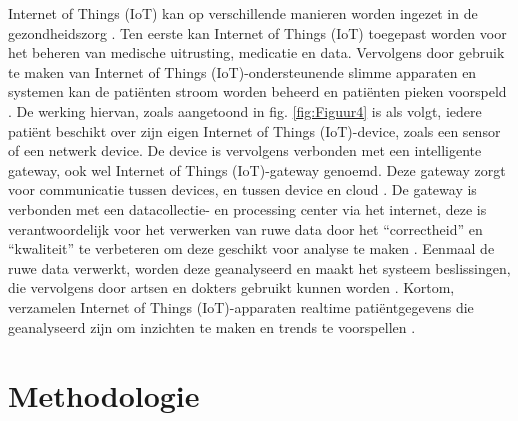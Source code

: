 Internet of Things (IoT) kan op verschillende manieren worden ingezet in de gezondheidszorg \autocite{Huang2021}. Ten eerste kan Internet of Things (IoT) toegepast worden voor het beheren van medische uitrusting, medicatie en data. Vervolgens door gebruik te maken van Internet of Things (IoT)-ondersteunende slimme apparaten en systemen kan de patiënten stroom worden beheerd \autocite{Almotaira2023} en patiënten pieken voorspeld \autocite{King2022}. De werking hiervan, zoals aangetoond in fig. \ref{fig:Figuur4} is als volgt, iedere patiënt beschikt over zijn eigen Internet of Things (IoT)-device, zoals een sensor of een netwerk device. De device is vervolgens verbonden met een intelligente gateway, ook wel Internet of Things (IoT)-gateway genoemd. Deze gateway zorgt voor communicatie tussen devices, en tussen device en cloud \autocite{Upadrista2021}. De gateway is verbonden met een datacollectie- en processing center via het internet, deze is verantwoordelijk voor het verwerken van ruwe data door het “correctheid” en “kwaliteit” te verbeteren om deze geschikt voor analyse te maken \autocite{Sirisha2023}. Eenmaal de ruwe data verwerkt, worden deze geanalyseerd en maakt het systeem beslissingen, die vervolgens door artsen en dokters gebruikt kunnen worden \autocite{Singh2023}. Kortom, verzamelen Internet of Things (IoT)-apparaten realtime patiëntgegevens die geanalyseerd zijn om inzichten te maken en trends te voorspellen \autocite{Alrehaili2023, Sidhu2023}. 

\section{Methodologie}%
\label{sec:methodologie}




